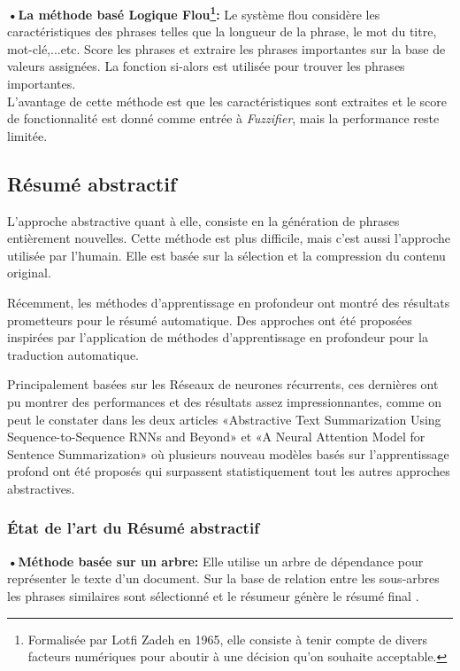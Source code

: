         \textbf{•La méthode basé Logique Flou\footnote{Formalisée par Lotfi Zadeh en 1965, elle consiste à tenir compte de divers facteurs numériques pour aboutir à une décision qu'on souhaite acceptable.}:} Le système flou considère les caractéristiques des phrases telles que la longueur de la phrase, le mot du titre, mot-clé,...etc\cite{10}. Score les phrases et extraire les phrases importantes sur la base de valeurs assignées. La fonction si-alors est utilisée pour trouver les phrases importantes.\\
        L'avantage de cette méthode est que les caractéristiques sont extraites et le score de fonctionnalité est donné comme entrée à \emph{Fuzzifier}, mais la performance reste limitée.\cite{surveysummarization}

    \subsection{Résumé abstractif}
        L'approche abstractive quant à elle, consiste en la génération de phrases entièrement nouvelles. Cette méthode est plus difficile, mais c'est aussi l'approche utilisée par l'humain. Elle est basée sur la sélection et la compression du contenu original.

        Récemment, les méthodes d'apprentissage en profondeur ont montré des résultats prometteurs pour le résumé automatique. Des approches ont été proposées inspirées par l'application de méthodes d'apprentissage en profondeur pour la traduction automatique.

        Principalement basées sur les Réseaux de neurones récurrents, ces dernières ont pu montrer des performances et des résultats assez impressionnantes, comme on peut le constater dans les deux articles «Abstractive Text Summarization Using Sequence-to-Sequence RNNs and Beyond»\cite{atsuss} et «A Neural Attention Model for Sentence Summarization»\cite{ruch} où plusieurs nouveau modèles basés sur l'apprentissage profond ont été proposés qui surpassent statistiquement tout les autres approches abstractives.

        \subsubsection{État de l'art du Résumé abstractif}
        \textbf{•Méthode basée sur un arbre:} Elle utilise un arbre de dépendance pour représenter le texte d'un document. Sur la base de relation entre les sous-arbres les phrases similaires sont sélectionné et le résumeur génère le résumé final \cite{5}.
            
